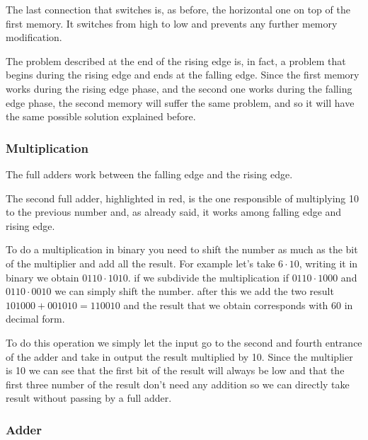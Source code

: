 \documentclass{article}
\begin{document}
The last connection that switches is, as before, the horizontal one on top of the first memory. It switches from high to low and prevents any further memory modification.

\vspace{3mm}

The problem described at the end of the rising edge is, in fact, a problem that begins during the rising edge and ends at the falling edge. Since the first memory works during the rising edge phase, and the second one works during the falling edge phase, the second memory will suffer the same problem, and so it will have the same possible solution explained before.


\subsubsection{Multiplication}

The full adders work between the falling edge and the rising edge.

\vspace{3mm}

The second full adder, highlighted in red, is the one responsible of multiplying 10 to the previous number and, as already said, it works among falling edge and rising edge.

\vspace{3mm}

To do a multiplication in binary you need to shift the number as much as the bit of the multiplier and add all the result. For example let's take $6 \cdot 10$, writing it in binary we obtain 
$0110 \cdot 1010$. if we subdivide the multiplication if $0110 \cdot 1000$ and $0110 \cdot 0010$ we can simply shift the number. 
after this we add the two result $101000 + 001010 = 110010$ and the result that we obtain corresponds with 60 in decimal form. %

\vspace{3mm}

To do this operation we simply let the input go to the second and fourth entrance of the adder and take in output the result multiplied by 10. Since the multiplier is 10 we can see that the first bit of the result will always be low and that the first three number of the result don't need any addition so we can directly take result without passing by a full adder. %


\subsubsection{Adder}
\end{document}
